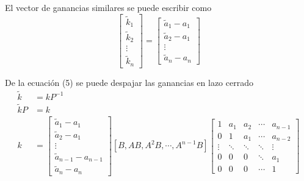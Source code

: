 El vector de ganancias similares se puede escribir como
\[
    \begin{bmatrix}
        \tilde{k}_{1} \\ \tilde{k}_{2} \\ \vdots \\ \tilde{k}_{n}
    \end{bmatrix}
    =
    \begin{bmatrix}
        \tilde{a}_1 - a_{1} \\
        \tilde{a}_{2} -a_{1} \\
        \vdots \\
        \tilde{a}_n -a_{n}
    \end{bmatrix}
\]

De la ecuación (5) se puede despajar las ganancias en lazo cerrado
\[
    \begin{split}
        \tilde{k} & = kP^{-1} \\
        \tilde{k}P & = k \\
        k & =
        \begin{bmatrix}
            \tilde{a}_1 - a_{1} \\
            \tilde{a}_{2} -a_{1} \\
            \vdots \\
            \tilde{a}_{n-1} -a_{n-1} \\
            \tilde{a}_{n} -a_{n}
        \end{bmatrix}
        [B, AB, A^{2}B, \cdots, A^{n-1}B ]
        \begin{bmatrix}
            1 & a_{1} & a_{2} & \cdots & a_{n-1} \\
            0 & 1 & a_{1} & \cdots & a_{n-2}\\
            \vdots & \ddots & \ddots & \ddots & \vdots \\
            0 & 0 & 0 & \ddots & a_{1} \\
            0 & 0 & 0 & \cdots & 1
        \end{bmatrix}
    \end{split}
\]